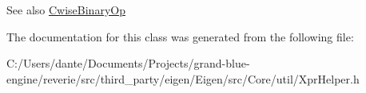 \begin{DoxySeeAlso}{See also}
\mbox{\hyperlink{class_eigen_1_1_cwise_binary_op}{Cwise\+Binary\+Op}} 
\end{DoxySeeAlso}


The documentation for this class was generated from the following file\+:\begin{DoxyCompactItemize}
\item 
C\+:/\+Users/dante/\+Documents/\+Projects/grand-\/blue-\/engine/reverie/src/third\+\_\+party/eigen/\+Eigen/src/\+Core/util/Xpr\+Helper.\+h\end{DoxyCompactItemize}
